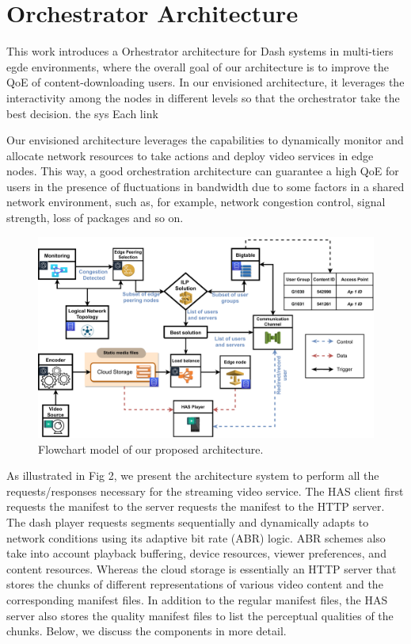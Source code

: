 \section{Orchestrator Architecture}
\label{sec:mechanism}

This work introduces a Orhestrator architecture for Dash systems in multi-tiers egde environments, where the overall goal of our architecture is to improve the QoE of content-downloading users. In our envisioned architecture, it leverages the interactivity among the nodes in different levels so that the orchestrator take the best decision. the sys Each link  

Our envisioned architecture leverages the capabilities to dynamically monitor and allocate network resources to take actions and deploy video services in edge nodes. This way, a good orchestration architecture can guarantee a high QoE for users in the presence of fluctuations in bandwidth due to some factors in a shared network environment, such as, for example, network congestion control, signal strength, loss of packages and so on.

\begin{figure}
  \includegraphics[width=\linewidth]{images/flow-model-infrastructure.pdf}
  \caption{Flowchart model of our proposed architecture.}
\end{figure}

As illustrated in Fig 2, we present the architecture system to perform all the requests/responses necessary for the streaming video service. The HAS client first requests the manifest to the server requests the manifest to the HTTP server. The dash player requests segments sequentially and dynamically adapts to network conditions using its adaptive bit rate (ABR) logic. ABR schemes also take into account playback buffering, device resources, viewer preferences, and content resources. Whereas the cloud storage is essentially an HTTP server that stores the chunks of different representations of various video content and the corresponding manifest files. In addition to the regular manifest files, the HAS server also stores the quality manifest files to list the perceptual qualities of the chunks. Below, we discuss the components in more detail.


